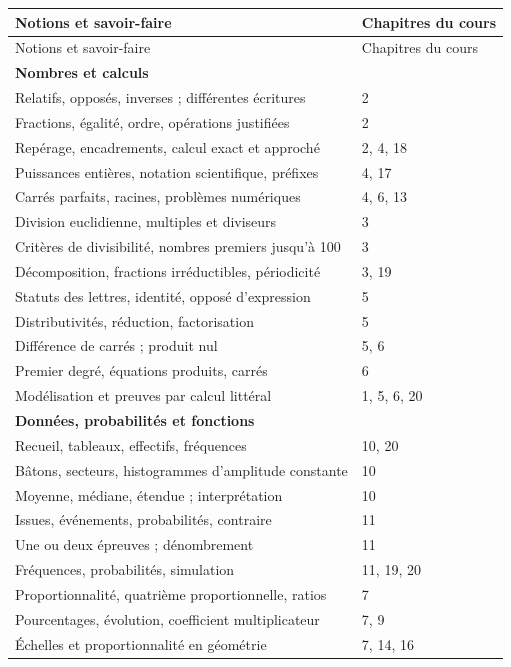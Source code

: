 \documentclass[11pt,a4paper,oneside]{book}
\begin{document}
\small
\begin{longtable}{p{}p{}}
\toprule Notions et savoir-faire & Chapitres du cours\\\midrule
\endfirsthead
\toprule Notions et savoir-faire & Chapitres du cours\\\midrule\endhead
\multicolumn{2}{l}{\textbf{Nombres et calculs}}\\
Relatifs, opposés, inverses ; différentes écritures & 2\\
Fractions, égalité, ordre, opérations justifiées & 2\\
Repérage, encadrements, calcul exact et approché & 2, 4, 18\\
Puissances entières, notation scientifique, préfixes & 4, 17\\
Carrés parfaits, racines, problèmes numériques & 4, 6, 13\\
Division euclidienne, multiples et diviseurs & 3\\
Critères de divisibilité, nombres premiers jusqu'à 100 & 3\\
Décomposition, fractions irréductibles, périodicité & 3, 19\\
Statuts des lettres, identité, opposé d'expression & 5\\
Distributivités, réduction, factorisation & 5\\
Différence de carrés ; produit nul & 5, 6\\
Premier degré, équations produits, carrés & 6\\
Modélisation et preuves par calcul littéral & 1, 5, 6, 20\\
\midrule
\multicolumn{2}{l}{\textbf{Données, probabilités et fonctions}}\\
Recueil, tableaux, effectifs, fréquences & 10, 20\\
Bâtons, secteurs, histogrammes d'amplitude constante & 10\\
Moyenne, médiane, étendue ; interprétation & 10\\
Issues, événements, probabilités, contraire & 11\\
Une ou deux épreuves ; dénombrement & 11\\
Fréquences, probabilités, simulation & 11, 19, 20\\
Proportionnalité, quatrième proportionnelle, ratios & 7\\
Pourcentages, évolution, coefficient multiplicateur & 7, 9\\
Échelles et proportionnalité en géométrie & 7, 14, 16\\

\end{longtable}
\end{document}
